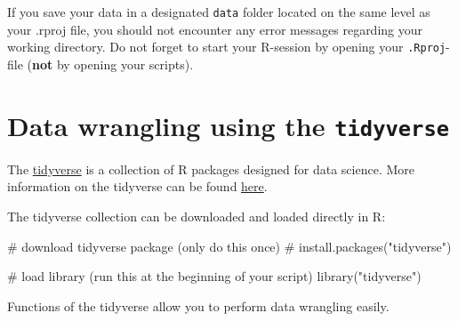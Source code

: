 \documentclass[
  letterpaper,
  DIV=11,
  numbers=noendperiod]{scrreprt}
\newenvironment{Shaded}{\begin{snugshade}}{\end{snugshade}}
\newcommand{\CommentTok}[1]{\textcolor[rgb]{0.37,0.37,0.37}{#1}}
\newcommand{\FunctionTok}[1]{\textcolor[rgb]{0.28,0.35,0.67}{#1}}
\newcommand{\NormalTok}[1]{\textcolor[rgb]{0.00,0.23,0.31}{#1}}
\newcommand{\StringTok}[1]{\textcolor[rgb]{0.13,0.47,0.30}{#1}}
\begin{document}
\begin{tcolorbox}[enhanced jigsaw, rightrule=.15mm, colframe=quarto-callout-important-color-frame, breakable, opacityback=0, bottomrule=.15mm, arc=.35mm, left=2mm, leftrule=.75mm, toprule=.15mm, colback=white]
\begin{minipage}[t]{5.5mm}
\textcolor{quarto-callout-important-color}{\faExclamation}
\end{minipage}%
\begin{minipage}[t]{\textwidth - 5.5mm}

If you save your data in a designated \texttt{data} folder located on
the same level as your .rproj file, you should not encounter any error
messages regarding your working directory. Do not forget to start your
R-session by opening your \texttt{.Rproj}-file (\textbf{not} by opening
your scripts).

\end{minipage}%
\end{tcolorbox}


\hypertarget{data-wrangling-using-the-tidyverse}{%
\chapter{\texorpdfstring{Data wrangling using the
\texttt{tidyverse}}{Data wrangling using the tidyverse}}\label{data-wrangling-using-the-tidyverse}}

\hfill\break
\hfill\break
The \href{https://www.tidyverse.org/}{tidyverse} is a collection of R
packages designed for data science. More information on the tidyverse
can be found \href{https://r4ds.had.co.nz/}{here}.

The tidyverse collection can be downloaded and loaded directly in R:

\begin{Shaded}
\begin{Highlighting}[]
\CommentTok{\# download tidyverse package (only do this once)}
\CommentTok{\# install.packages("tidyverse") }

\CommentTok{\# load library (run this at the beginning of your script)}
\FunctionTok{library}\NormalTok{(}\StringTok{"tidyverse"}\NormalTok{) }
\end{Highlighting}
\end{Shaded}

Functions of the tidyverse allow you to perform data wrangling easily.
\end{document}
